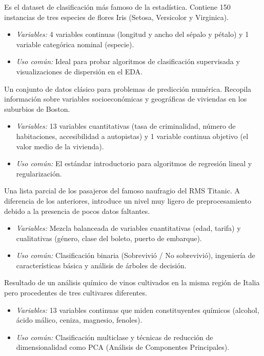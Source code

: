 \begin{description}[leftmargin=1.5em, labelindent=0.5em]
    \item[Iris Flower Dataset (Ronald Fisher, 1936):] Es el dataset de clasificación más famoso de la estadística. Contiene 150 instancias de tres especies de flores Iris (Setosa, Versicolor y Virginica).
    \begin{itemize}
        \item \textit{Variables:} 4 variables continuas (longitud y ancho del sépalo y pétalo) y 1 variable categórica nominal (especie).
        \item \textit{Uso común:} Ideal para probar algoritmos de clasificación supervisada y visualizaciones de dispersión en el EDA.
    \end{itemize}

    \item[Boston Housing Dataset:] Un conjunto de datos clásico para problemas de predicción numérica. Recopila información sobre variables socioeconómicas y geográficas de viviendas en los suburbios de Boston.
    \begin{itemize}
        \item \textit{Variables:} 13 variables cuantitativas (tasa de criminalidad, número de habitaciones, accesibilidad a autopistas) y 1 variable continua objetivo (el valor medio de la vivienda).
        \item \textit{Uso común:} El estándar introductorio para algoritmos de regresión lineal y regularización.
    \end{itemize}

    \item[Titanic Dataset:] Una lista parcial de los pasajeros del famoso naufragio del RMS Titanic. A diferencia de los anteriores, introduce un nivel muy ligero de preprocesamiento debido a la presencia de pocos datos faltantes.
    \begin{itemize}
        \item \textit{Variables:} Mezcla balanceada de variables cuantitativas (edad, tarifa) y cualitativas (género, clase del boleto, puerto de embarque).
        \item \textit{Uso común:} Clasificación binaria (Sobrevivió / No sobrevivió), ingeniería de características básica y análisis de árboles de decisión.
    \end{itemize}

    \item[Wine Dataset:] Resultado de un análisis químico de vinos cultivados en la misma región de Italia pero procedentes de tres cultivares diferentes.
    \begin{itemize}
        \item \textit{Variables:} 13 variables continuas que miden constituyentes químicos (alcohol, ácido málico, ceniza, magnesio, fenoles).
        \item \textit{Uso común:} Clasificación multiclase y técnicas de reducción de dimensionalidad como PCA (Análisis de Componentes Principales).
    \end{itemize}
\end{description}

